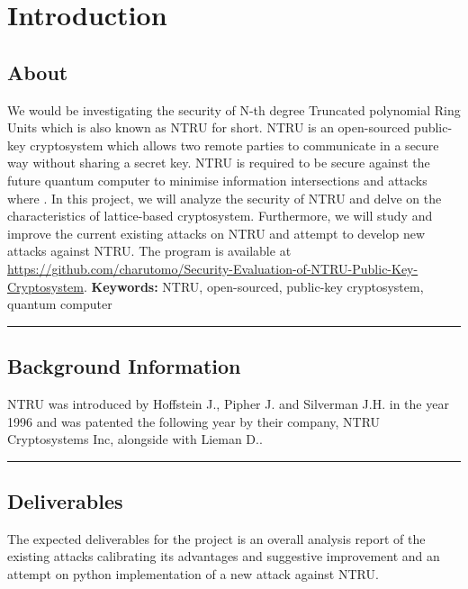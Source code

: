 
\chapter{Introduction}
\section{About}
We would be investigating the security of N-th degree Truncated polynomial Ring Units which is also known as NTRU for short.
NTRU is an open-sourced public-key cryptosystem which allows two remote parties to communicate in a secure way without sharing a secret key. 
NTRU is required to be secure against the future quantum computer to minimise information intersections and attacks where .
In this project, we will analyze the security of NTRU and delve on the characteristics of lattice-based cryptosystem.
Furthermore, we will study and improve the current existing attacks on NTRU and attempt to develop new attacks against NTRU. 
 The program is available at 
\url{https://github.com/charutomo/Security-Evaluation-of-NTRU-Public-Key-Cryptosystem}.
\textbf{Keywords:} NTRU, open-sourced, public-key cryptosystem, quantum computer
\newline
\par\noindent\rule{\textwidth}{0.4pt}

\section{Background Information}
NTRU was introduced by Hoffstein J., Pipher J. and Silverman J.H. in the year 1996 and was patented the following year by their company, NTRU Cryptosystems Inc, alongside with Lieman D..
\newline
\par\noindent\rule{\textwidth}{0.4pt}

\section{Deliverables}
The expected deliverables for the project is an overall analysis report of the existing attacks calibrating its advantages and suggestive improvement and an attempt on python implementation of a new attack against NTRU. 
\newpage